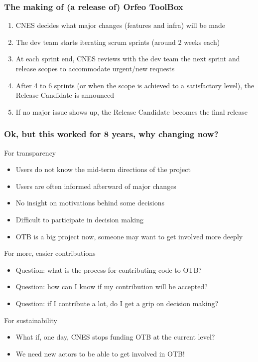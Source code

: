 \documentclass[8pt]{beamer}
\begin{document}
\begin{frame}
\frametitle{The making of (a release of) Orfeo ToolBox}
\begin{enumerate}
\item CNES decides what major changes (features and infra) will be made
\item The dev team starts iterating scrum sprints (around 2 weeks each)
\item At each sprint end, CNES reviews with the dev team the next sprint and release scopes to accommodate urgent/new requests 
\item After 4 to 6 sprints (or when the scope is achieved to a satisfactory level), the Release Candidate is announced
\item If no major issue shows up, the Release Candidate becomes the final release
\end{enumerate}
\end{frame}

\begin{frame}
\frametitle{Ok, but this worked for 8 years, why changing now?}
\begin{block}{For transparency}
\begin{itemize}
\item Users do not know the mid-term directions of the project
\item Users are often informed afterward of major changes
\item No insight on motivations behind some decisions
\item Difficult to participate in decision making
\item OTB is a big project now, someone may want to get involved more deeply
\end{itemize}
\end{block}

\begin{block}{For more, easier contributions}
\begin{itemize}
\item Question: what is the process for contributing code to OTB? 
\item Question: how can I know if my contribution will be accepted?
\item Question: if I contribute a lot, do I get a grip on decision making?
\end{itemize}
\end{block}

\begin{block}{For sustainability}
\begin{itemize}
\item What if, one day, CNES stops funding OTB at the current level?
\item We need new actors to be able to get involved in OTB!
\end{itemize}
\end{block}
\end{frame}
\end{document}
